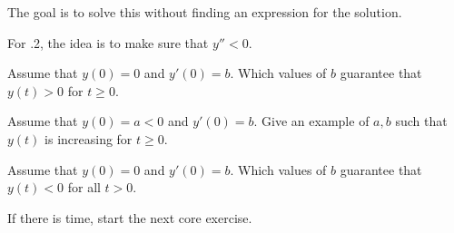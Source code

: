 \begin{annotation}
\begin{goals}
	The goal is to solve this without finding an expression for the solution.
	
	For .2, the idea is to make sure that $y''<0$. 
\end{goals}	
\end{annotation}
	\begin{parts}
		\item Assume that $y(0)=0$ and $y'(0)=b$. Which values of $b$ guarantee that $y(t)>0$ for $t\geq 0$. 
		\item Assume that $y(0)=a<0$ and $y'(0)=b$. Give an example of $a,b$ such that $y(t)$ is increasing for $t\geq 0$. 
		\item Assume that $y(0)=0$ and $y'(0)=b$. Which values of $b$ guarantee that $y(t)<0$ for all $t>0$.
\begin{annotation}
\begin{goals}
	If there is time, start the next core exercise.
\end{goals}
\end{annotation}


%

	\end{parts}


	

\bookonlynewpage

